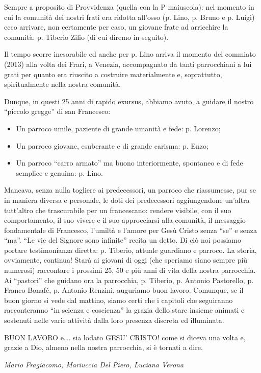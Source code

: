 Sempre a proposito di Provvidenza (quella con la P maiuscola): nel momento in cui la 
comunità dei nostri frati era ridotta all’osso (p. Lino, p. Bruno e p. Luigi) ecco arrivare, non 
certamente per caso, un giovane frate ad arricchire la comunità: p. Tiberio Zilio (di cui diremo in 
seguito).

Il tempo scorre inesorabile ed anche per p. Lino arriva il momento del commiato (2013) alla volta 
dei Frari, a Venezia, accompagnato da tanti parrocchiani a lui grati per quanto era riuscito a 
costruire materialmente e, soprattutto, spiritualmente nella nostra comunità. 

Dunque, in questi 25 anni di rapido exursus, abbiamo avuto, a guidare il nostro “piccolo 
gregge” di san Francesco:
\begin{itemize}
	\item Un parroco umile, paziente di grande umanità e fede: p. Lorenzo;
	\item Un parroco giovane, esuberante e di grande carisma: p. Enzo;
	\item Un parroco “carro armato” ma buono interiormente, spontaneo e di fede semplice e genuina: p. Lino. 
\end{itemize}
Mancava, senza nulla togliere ai predecessori, un parroco che riassumesse, pur se in maniera 
diversa e personale, le doti dei predecessori aggiungendone un’altra tutt’altro che trascurabile per 
un francescano: rendere visibile, con il suo comportamento, il suo vivere e il suo approcciarsi alla 
comunità, il messaggio fondamentale di Francesco, l’umiltà e l’amore per Gesù Cristo senza “se” e 
senza “ma”.
“Le vie del Signore sono infinite” recita un detto. Di ciò noi possiamo portare testimonianza diretta: 
p. Tiberio, attuale guardiano e parroco. La storia, ovviamente, continua!
Starà ai giovani di oggi (che speriamo siano sempre più numerosi) raccontare i prossimi 25, 
50 e più anni di vita della nostra parrocchia. Ai “pastori” che guidano ora la parrocchia, p. Tiberio, 
p. Antonio Pastorello, p. Franco Bonafé, p. Antonio Renzini, auguriamo buon lavoro.
Comunque, se il buon giorno si vede dal mattino, siamo certi che i capitoli che seguiranno 
racconteranno “in scienza e coscienza” la grazia dello stare insieme animati e sostenuti nelle varie 
attività dalla loro presenza discreta ed illuminata.
\medbreak
\begin{samepage}
BUON LAVORO e…. sia lodato GESU’ CRISTO! come si diceva una volta e, grazie a Dio, 
almeno nella nostra parrocchia, si è tornati a dire.
\begin{flushright}
\textit{Mario Fragiacomo, Mariuccia Del Piero, Luciana Verona}
\end{flushright}
\end{samepage}